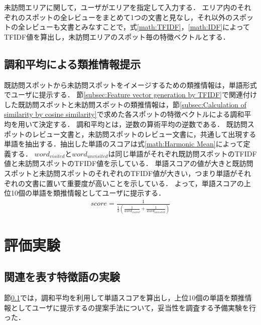 \documentclass{deimj}
\begin{document}
未訪問エリアに関して，ユーザがエリアを指定して入力する．
エリア内のそれぞれのスポットの全レビューをまとめて1つの文書と見なし，それ以外のスポットの全レビューも文書とみなすことで，式\ref{math:TFIDF}，\ref{math:IDF}によってTFIDF値を算出し，未訪問エリアのスポット毎の特徴ベクトルとする．

\subsection{調和平均による類推情報提示}
\label{subsec:Presenting similar information by harmonic mean}
既訪問スポットから未訪問スポットをイメージするための類推情報は，単語形式でユーザに提示する．
節\ref{subsec:Feature vector generation by TFIDF}で関連付けした既訪問スポットと未訪問スポットの類推情報は，節\ref{subsec:Calculation of similarity by cosine similarity}で求めた各スポットの特徴ベクトルによる調和平均を用いて決定する．
調和平均とは，逆数の算術平均の逆数である．
既訪問スポットのレビュー文書と，未訪問スポットのレビュー文書に，共通して出現する単語を抽出する．抽出した単語のスコアは式\ref{math:Harmonic Mean}によって定義する．
$word_{visited}$と$word_{unvisited}$は同じ単語がそれぞれ既訪問スポットのTFIDF値と未訪問スポットのTFIDF値を示している．
単語スコアの値が大きと既訪問スポットと未訪問スポットのそれぞれのTFIDF値が大きい，つまり単語がそれぞれの文書に置いて重要度が高いことを示している．
よって，単語スコアの上位10個の単語を類推情報としてユーザに提示する．
\begin{eqnarray}
  score=\frac{1}{\frac{1}{2}(\frac{1}{word_{visited}}+\frac{1}{word_{unvisited}})}
  \label{math:Harmonic Mean}
\end{eqnarray}

\section{評価実験}
\label{sec:Evaluation Experiment}
\subsection{関連を表す特徴語の実験}
\label{subsec:Experiment of feature word representing relation}

節\ref{subsec:Presenting similar information by harmonic mean}では，調和平均を利用して単語スコアを算出し，上位10個の単語を類推情報としてユーザに提示するの提案手法について，妥当性を調査する予備実験を行った．
\end{document}
